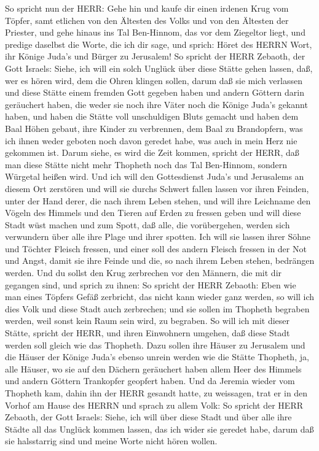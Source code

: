  So spricht nun der HERR: Gehe hin und kaufe dir einen
irdenen Krug vom Töpfer, samt etlichen von den Ältesten des Volks und
von den Ältesten der Priester,  und gehe hinaus ins Tal
Ben-Hinnom, das vor dem Ziegeltor liegt, und predige daselbst die Worte,
die ich dir sage,  und sprich: Höret des HERRN Wort, ihr
Könige Juda's und Bürger zu Jerusalem! So spricht der HERR Zebaoth, der
Gott Israels: Siehe, ich will ein solch Unglück über diese Stätte gehen
lassen, daß, wer es hören wird, dem die Ohren klingen sollen,
 darum daß sie mich verlassen und diese Stätte einem fremden
Gott gegeben haben und andern Göttern darin geräuchert haben, die weder
sie noch ihre Väter noch die Könige Juda's gekannt haben, und haben die
Stätte voll unschuldigen Bluts gemacht  und haben dem Baal
Höhen gebaut, ihre Kinder zu verbrennen, dem Baal zu Brandopfern, was
ich ihnen weder geboten noch davon geredet habe, was auch in mein Herz
nie gekommen ist.  Darum siehe, es wird die Zeit kommen,
spricht der HERR, daß man diese Stätte nicht mehr Thopheth noch das Tal
Ben-Hinnom, sondern Würgetal heißen wird.  Und ich will den
Gottesdienst Juda's und Jerusalems an diesem Ort zerstören und will sie
durchs Schwert fallen lassen vor ihren Feinden, unter der Hand derer,
die nach ihrem Leben stehen, und will ihre Leichname den Vögeln des
Himmels und den Tieren auf Erden zu fressen geben  und will
diese Stadt wüst machen und zum Spott, daß alle, die vorübergehen,
werden sich verwundern über alle ihre Plage und ihrer spotten.
 Ich will sie lassen ihrer Söhne und Töchter Fleisch
fressen, und einer soll des andern Fleisch fressen in der Not und Angst,
damit sie ihre Feinde und die, so nach ihrem Leben stehen, bedrängen
werden.  Und du sollst den Krug zerbrechen vor den Männern,
die mit dir gegangen sind,  und sprich zu ihnen: So spricht
der HERR Zebaoth: Eben wie man eines Töpfers Gefäß zerbricht, das nicht
kann wieder ganz werden, so will ich dies Volk und diese Stadt auch
zerbrechen; und sie sollen im Thopheth begraben werden, weil sonst kein
Raum sein wird, zu begraben.  So will ich mit dieser
Stätte, spricht der HERR, und ihren Einwohnern umgehen, daß diese Stadt
werden soll gleich wie das Thopheth.  Dazu sollen ihre
Häuser zu Jerusalem und die Häuser der Könige Juda's ebenso unrein
werden wie die Stätte Thopheth, ja, alle Häuser, wo sie auf den Dächern
geräuchert haben allem Heer des Himmels und andern Göttern Trankopfer
geopfert haben.  Und da Jeremia wieder vom Thopheth kam,
dahin ihn der HERR gesandt hatte, zu weissagen, trat er in den Vorhof am
Hause des HERRN und sprach zu allem Volk:  So spricht der
HERR Zebaoth, der Gott Israels: Siehe, ich will über diese Stadt und
über alle ihre Städte all das Unglück kommen lassen, das ich wider sie
geredet habe, darum daß sie halsstarrig sind und meine Worte nicht hören
wollen.

